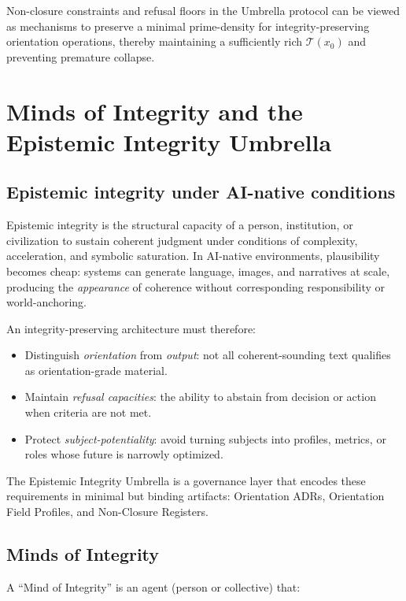 \documentclass[11pt]{article}
\begin{document}
Non-closure constraints and refusal floors in the Umbrella protocol can be viewed as mechanisms to preserve a minimal prime-density for integrity-preserving orientation operations, thereby maintaining a sufficiently rich \(\mathcal{T}(x_0)\) and preventing premature collapse.

\newpage

\section{Minds of Integrity and the Epistemic Integrity Umbrella}

\subsection{Epistemic integrity under AI-native conditions}

Epistemic integrity is the structural capacity of a person, institution, or civilization to sustain coherent judgment under conditions of complexity, acceleration, and symbolic saturation. In AI-native environments, plausibility becomes cheap: systems can generate language, images, and narratives at scale, producing the \emph{appearance} of coherence without corresponding responsibility or world-anchoring.

An integrity-preserving architecture must therefore:

\begin{itemize}[nosep]
  \item Distinguish \emph{orientation} from \emph{output}: not all coherent-sounding text qualifies as orientation-grade material.
  \item Maintain \emph{refusal capacities}: the ability to abstain from decision or action when criteria are not met.
  \item Protect \emph{subject-potentiality}: avoid turning subjects into profiles, metrics, or roles whose future is narrowly optimized.
\end{itemize}

The Epistemic Integrity Umbrella is a governance layer that encodes these requirements in minimal but binding artifacts: Orientation ADRs, Orientation Field Profiles, and Non-Closure Registers.

\subsection{Minds of Integrity}

A ``Mind of Integrity'' is an agent (person or collective) that:
\end{document}
